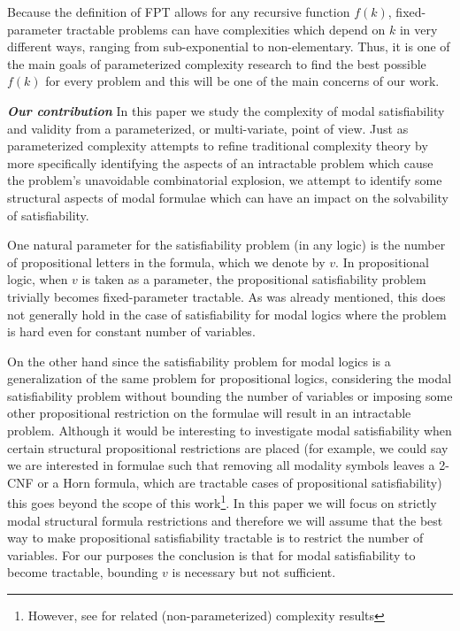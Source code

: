 \documentclass{llncs}
\begin{document}
Because the definition of FPT allows for any recursive function $f(k)$, fixed-parameter tractable problems can
have complexities which depend on $k$ in very different ways, ranging from sub-exponential to non-elementary.
Thus, it is one of the main goals of parameterized complexity research to find the best possible $f(k)$ for every
problem and this will be one of the main concerns of our work.



\textit{\textbf{Our contribution}}
In this paper we study the complexity of modal satisfiability and
validity from a parameterized, or multi-variate, point of view. Just
as parameterized complexity attempts to refine traditional
complexity theory by more specifically identifying the aspects of an
intractable problem which cause the problem's unavoidable
combinatorial explosion, we attempt to identify some structural aspects of
modal formulae which can have an impact on the solvability of
satisfiability.


One natural parameter for the satisfiability problem (in any logic)
is the number of propositional letters in the formula, which we
denote by $v$. In propositional logic, when $v$ is taken as a
parameter, the propositional satisfiability problem trivially
becomes fixed-parameter tractable.  As was already mentioned, this
does not generally hold in the case of satisfiability for modal
logics where the problem is hard even for constant number of
variables.

On the other hand since the satisfiability problem for modal logics
is a generalization of the same problem for propositional logics,
considering the modal satisfiability problem without bounding the
number of variables or imposing some other propositional restriction
on the formulae will result in an intractable problem. Although it
would be interesting to investigate modal satisfiability when
certain structural propositional restrictions are placed (for
example, we could say we are interested in formulae such that
removing all modality symbols leaves a 2-CNF or a Horn formula,
which are tractable cases of propositional satisfiability) this goes
beyond the scope of this work\footnote{However, see
\cite{nguyen2005cfm} for related (non-parameterized) complexity
results}. In this paper we will focus on strictly modal structural
formula restrictions and therefore we will assume that the best way
to make propositional satisfiability tractable is to restrict the
number of variables. For our purposes the conclusion is that for
modal satisfiability to become tractable, bounding $v$ is necessary
but not sufficient.
\end{document}
